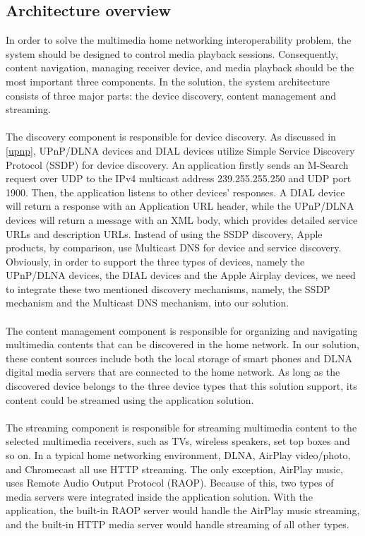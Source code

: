 \subsection{Architecture overview\label{3_1}}
In order to solve the multimedia home networking interoperability problem, the system should be designed to control media playback sessions. Consequently, content navigation, managing receiver device, and media playback should be the most important three components. In the solution, the system architecture consists of three major parts: the device discovery, content management and streaming.\\
\\
The discovery component is responsible for device discovery. As discussed
in \ref{upnp}, UPnP/DLNA devices and DIAL devices utilize Simple Service Discovery
Protocol (SSDP) for device discovery. An application firstly sends an M-Search
request over UDP to the IPv4 multicast address 239.255.255.250 and UDP port 1900. Then, the application listens to other devices' responses. A DIAL device will return a response with an Application URL header, while the UPnP/DLNA devices will return a message with an XML body, which provides detailed service URLs and description URLs. Instead of using the SSDP discovery, Apple products, by comparison, use Multicast DNS for device and service discovery. Obviously, in order to support the three types of devices, namely the UPnP/DLNA devices, the DIAL devices and the Apple Airplay devices, we need to integrate these two mentioned discovery mechanisms, namely, the SSDP mechanism and the Multicast DNS mechanism, into our solution.\\
\\
The content management component is responsible for organizing and
 navigating multimedia contents that can be discovered in the home network. In our solution, these content sources include both the local storage of smart phones and DLNA digital media servers that are connected to the home network. As long as the discovered device belongs to the three device types that this solution support, its content could be streamed using the application solution.\\
\\
The streaming component is responsible for streaming multimedia content to the selected multimedia receivers, such as TVs, wireless speakers, set top boxes and so on. In a typical home networking environment, DLNA, AirPlay video/photo, and Chromecast all use HTTP streaming. The only exception, AirPlay music, uses Remote Audio Output Protocol (RAOP). Because of this, two types of media servers were integrated inside the application solution. With the application, the built-in RAOP server would handle the AirPlay music streaming, and the built-in HTTP media server would handle streaming of all other types.

